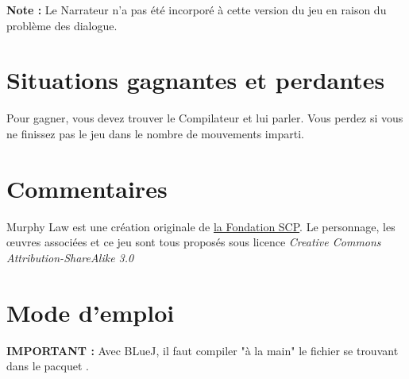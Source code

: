 \textbf{Note :} Le Narrateur n'a pas été incorporé à cette version du jeu en raison du problème des dialogue.

\section{Situations gagnantes et perdantes}

Pour gagner, vous devez trouver le Compilateur et lui parler. Vous perdez si vous ne finissez pas le jeu dans le nombre de mouvements imparti.

\section{Commentaires}

Murphy Law est une création originale de \href{http://scp-wiki.wikidot.com/murphy-law-hub}{la Fondation SCP}. Le personnage, les œuvres associées et ce jeu sont tous proposés sous licence \emph{Creative Commons Attribution-ShareAlike 3.0}

\section{Mode d'emploi}

\textbf{IMPORTANT :} Avec BLueJ, il faut compiler "à la main" le fichier  se trouvant dans le pacquet .
 
